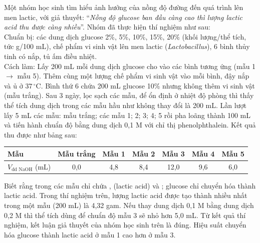 \documentclass[11pt,a4paper]{article}
\begin{document}
\begin{ex}
Một nhóm học sinh tìm hiểu ảnh hưởng của nồng độ đường đến quá trình lên men lactic, với giả thuyết: ``\textit{Nồng độ glucose ban đầu càng cao thì lượng lactic acid thu được càng nhiều}''. Nhóm đã thực hiện thí nghiệm như sau:\\
Chuẩn bị: các dung dịch glucose 2\%, 5\%, 10\%, 15\%, 20\% (khối lượng/thể tích, tức g/100 mL), chế phẩm vi sinh vật lên men lactic (\textit{Lactobacillus}), 6 bình thủy tinh có nắp, tủ ấm điều nhiệt.\\
Cách làm: Lấy 200 mL mỗi dung dịch glucose cho vào các bình tương ứng (mẫu 1 $\longrightarrow$ mẫu 5). Thêm cùng một lượng chế phẩm vi sinh vật vào mỗi bình, đậy nắp và ủ ở $37\,^\circ\text{C}$. Bình thứ 6 chứa 200 mL glucose 10\% nhưng không thêm vi sinh vật (mẫu trắng). Sau 3 ngày, lọc sạch các mẫu, để ổn định ở nhiệt độ phòng thì thấy thể tích dung dịch trong các mẫu hầu như không thay đổi là 200 mL. Lần lượt lấy 5 mL các mẫu: mẫu trắng; các mẫu 1; 2; 3; 4; 5 rồi pha loãng thành 100 mL và tiến hành chuẩn độ bằng dung dịch  0,1 M với chỉ thị phenolphthalein. Kết quả thu được như bảng sau:
\begin{center}
\begin{tabular}{|l|c|c|c|c|c|c|}
\hline
\textbf{Mẫu} & \textbf{Mẫu trắng} & \textbf{Mẫu 1} & \textbf{Mẫu 2} & \textbf{Mẫu 3} & \textbf{Mẫu 4} & \textbf{Mẫu 5} \\
\hline
$V_{\text{dd NaOH}}$ (mL) & 0,0 & 4,8 & 8,4 & 12,0 & 9,6 & 6,0 \\
\hline
\end{tabular}
\end{center}
Biết rằng trong các mẫu chỉ chứa ,  (lactic acid) và ; glucose chỉ chuyển hóa thành lactic acid.
\choiceTF
{\True Trong thí nghiệm trên, lượng lactic acid được tạo thành nhiều nhất trong một mẫu (200 mL) là 4,32 gam.}
{Nếu thay dung dịch  0,1 M bằng dung dịch  0,2 M thì thể tích  dùng để chuẩn độ mẫu 3 sẽ nhỏ hơn 5,0 mL.}
{Từ kết quả thí nghiệm, kết luận giả thuyết của nhóm học sinh trên là đúng.}
{\True Hiệu suất chuyển hóa glucose thành lactic acid ở mẫu 1 cao hơn ở mẫu 3.}
\end{ex}
\end{document}
